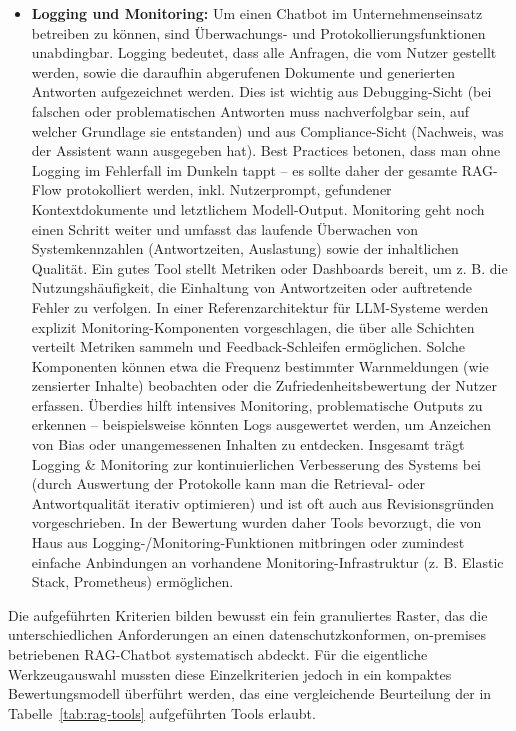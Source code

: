 \begin{itemize}
    \item \textbf{Logging und Monitoring:} Um einen Chatbot im Unternehmenseinsatz betreiben zu können, sind Überwachungs- und Protokollierungsfunktionen unabdingbar. Logging bedeutet, dass alle Anfragen, die vom Nutzer gestellt werden, sowie die daraufhin abgerufenen Dokumente und generierten Antworten aufgezeichnet werden. Dies ist wichtig aus Debugging-Sicht (bei falschen oder problematischen Antworten muss nachverfolgbar sein, auf welcher Grundlage sie entstanden) und aus Compliance-Sicht (Nachweis, was der Assistent wann ausgegeben hat). Best Practices betonen, dass man ohne Logging im Fehlerfall im Dunkeln tappt – es sollte daher der gesamte RAG-Flow protokolliert werden, inkl. Nutzerprompt, gefundener Kontextdokumente und letztlichem Modell-Output. Monitoring geht noch einen Schritt weiter und umfasst das laufende Überwachen von Systemkennzahlen (Antwortzeiten, Auslastung) sowie der inhaltlichen Qualität. Ein gutes Tool stellt Metriken oder Dashboards bereit, um z. B. die Nutzungshäufigkeit, die Einhaltung von Antwortzeiten oder auftretende Fehler zu verfolgen. In einer Referenzarchitektur für LLM-Systeme werden explizit Monitoring-Komponenten vorgeschlagen, die über alle Schichten verteilt Metriken sammeln und Feedback-Schleifen ermöglichen. Solche Komponenten können etwa die Frequenz bestimmter Warnmeldungen (wie zensierter Inhalte) beobachten oder die Zufriedenheitsbewertung der Nutzer erfassen. Überdies hilft intensives Monitoring, problematische Outputs zu erkennen – beispielsweise könnten Logs ausgewertet werden, um Anzeichen von Bias oder unangemessenen Inhalten zu entdecken. Insgesamt trägt Logging \& Monitoring zur kontinuierlichen Verbesserung des Systems bei (durch Auswertung der Protokolle kann man die Retrieval- oder Antwortqualität iterativ optimieren) und ist oft auch aus Revisionsgründen vorgeschrieben. In der Bewertung wurden daher Tools bevorzugt, die von Haus aus Logging-/Monitoring-Funktionen mitbringen oder zumindest einfache Anbindungen an vorhandene Monitoring-Infrastruktur (z. B. Elastic Stack, Prometheus) ermöglichen.
\end{itemize}


\noindent
Die aufgeführten Kriterien bilden bewusst ein fein granuliertes Raster, das die unterschiedlichen Anforderungen an einen datenschutzkonformen, on-premises betriebenen RAG-Chatbot systematisch abdeckt.
Für die eigentliche Werkzeugauswahl mussten diese Einzelkriterien jedoch in ein kompaktes Bewertungsmodell überführt werden, das eine vergleichende Beurteilung der in Tabelle~\ref{tab:rag-tools} aufgeführten Tools erlaubt.

